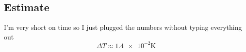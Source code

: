 \subsection{Estimate}
I'm very short on time so I just plugged the numbers without typing everything out
\begin{equation}
	\Delta T \approx \num{1,4e-2}\unit{\kelvin}
\end{equation}